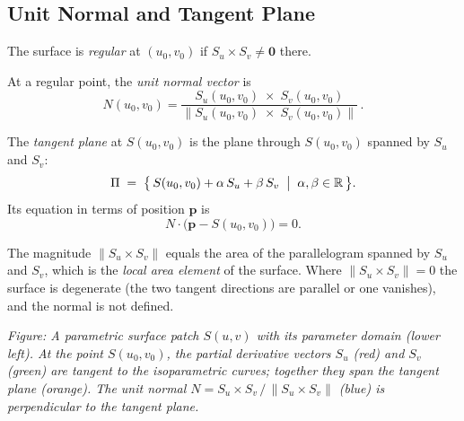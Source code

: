 \subsection{Unit Normal and Tangent Plane}

\begin{tcolorbox}[colback=propbox, colframe=propborder, arc=2pt,
  left=6pt, right=6pt, top=4pt, bottom=4pt,
  title={\small\textbf{Definition (Regularity, Unit Normal, Tangent Plane)}},
  fonttitle=\small\bfseries]
The surface is \emph{regular} at $(u_0,v_0)$ if
$S_u \times S_v \neq \mathbf{0}$ there.

At a regular point, the \emph{unit normal vector} is
\[
  N(u_0,v_0)
  = \frac{S_u(u_0,v_0)\;\times\; S_v(u_0,v_0)}
         {\|S_u(u_0,v_0)\;\times\; S_v(u_0,v_0)\|}\,.
\]

The \emph{tangent plane} at $S(u_0,v_0)$ is the plane through
$S(u_0,v_0)$ spanned by $S_u$ and $S_v$:
\[
  \Pi\;=\;\bigl\{\,S(u_0,v_0) + \alpha\,S_u + \beta\,S_v
               \;\bigm|\; \alpha,\beta\in\mathbb{R}\,\bigr\}.
\]
Its equation in terms of position $\mathbf{p}$ is
\[
  N\cdot\bigl(\mathbf{p} - S(u_0,v_0)\bigr) = 0.
\]
\end{tcolorbox}

\begin{remark*}
The magnitude $\|S_u \times S_v\|$ equals the area of the
parallelogram spanned by $S_u$ and $S_v$, which is the
\emph{local area element} of the surface.
Where $\|S_u \times S_v\| = 0$ the surface is degenerate
(the two tangent directions are parallel or one vanishes),
and the normal is not defined.
\end{remark*}

\vspace{1em}
\begin{center}

\end{center}

\begin{center}
\small\itshape
Figure: A parametric surface patch $S(u,v)$ with its parameter domain (lower left).
At the point $S(u_0,v_0)$, the partial derivative vectors $S_u$ (red) and $S_v$ (green)
are tangent to the isoparametric curves; together they span the tangent plane (orange).
The unit normal $N = S_u \times S_v\,/\,\|S_u \times S_v\|$ (blue) is perpendicular
to the tangent plane.
\end{center}

